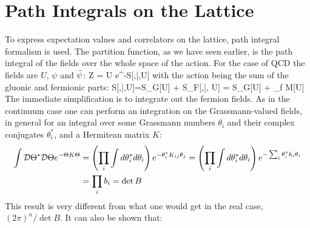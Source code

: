\section{Path Integrals on the Lattice}
\label{sec:pathintegral}
To express expectation values and correlators on the lattice, path integral formalism is used. The partition function, as we have seen earlier, is the path integral of the fields over the whole space of the action. For the case of QCD the fields are $U$, $\psi$ and $\bar{\psi}$:
\beq
	Z = \int \D\psi\D\bpsi\D U e^{-S[\psi,\bar{\psi},U] }  
\eeq
with the action being the sum of the gluonic and fermionic parts:
\beq
S[\psi,\bar{\psi},U]=S_G[U] + S_F[\psi,\bar{\psi}, U] = S_G[U] + \sum_f \bpsi M[U] \psi
\eeq
The immediate simplification is to integrate out the fermion fields. As in the continuum case one can perform an integration on the Grassmann-valued fields, in general for an integral over some Grassmann numbers $\theta_i$ and their complex conjugates $\theta_i^*$, and a Hermitean matrix $K$:
\begin{align}
    \label{lattice:grassman}
    \int \mathcal{D}\Theta^*\mathcal{D}\Theta e^{-\Theta K \Theta } &= \left( \prod_i\int d\theta_i^*d\theta_i \right)  e^{-\theta_i^* K_{ij} \theta_j } =  \left( \prod_i\int d\theta_i^*d\theta_i \right)  e^{-\sum_i\theta_i^* k_i \theta_i } \\\nonumber
    &= \prod_i b_i = \det B
\end{align} 
This result is very different from what one would get in the real case, $(2\pi)^n/\det B$. It can also be shown that:

